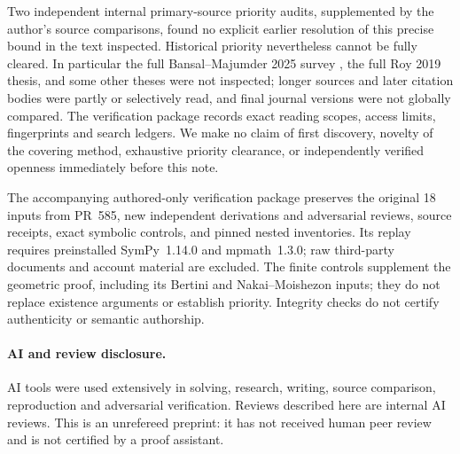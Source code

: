 \documentclass[11pt]{article}
\begin{document}
Two independent internal primary-source priority audits, supplemented by
the author's source comparisons, found no explicit earlier resolution of
this precise bound in the text inspected. Historical priority nevertheless
cannot be fully cleared. In particular the full Bansal--Majumder 2025
survey \cite{Survey2025}, the full Roy 2019 thesis, and some other theses
were not inspected; longer sources and later citation bodies were partly
or selectively read, and final journal versions were not globally compared.
The verification package records exact reading scopes, access limits,
fingerprints and search ledgers. We make no claim of first discovery,
novelty of the covering method, exhaustive priority clearance, or independently
verified openness immediately before this note.

The accompanying authored-only verification package preserves the original
18 inputs from PR~585, new independent derivations and adversarial reviews,
source receipts, exact symbolic controls, and pinned nested inventories.
Its replay requires preinstalled SymPy~1.14.0 and mpmath~1.3.0; raw third-party
documents and account material are excluded. The finite controls supplement
the geometric proof, including its Bertini and Nakai--Moishezon inputs;
they do not replace existence arguments or establish priority. Integrity
checks do not certify authenticity or semantic authorship.

\paragraph{AI and review disclosure.}
AI tools were used extensively in solving, research, writing, source
comparison, reproduction and adversarial verification. Reviews described
here are internal AI reviews. This is an unrefereed preprint: it has not
received human peer review and is not certified by a proof assistant.
\end{document}
